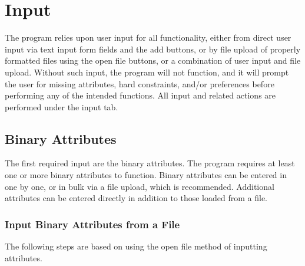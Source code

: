 \documentclass[12pt]{report}
\begin{document}
\chapter{Input}
The program relies upon user input for all functionality, either from direct user input via text input form fields and the add buttons, or by file upload of properly formatted files using the open file buttons, or a combination of user input and file upload. Without such input, the program will not function, and it will prompt the user for missing attributes, hard constraints, and/or preferences before performing any of the intended functions. All input and related actions are performed under the input tab.

\section{Binary Attributes}
The first required input are the binary attributes. The program requires at least one or more binary attributes to function. Binary attributes can be entered in one by one, or in bulk via a file upload, which is recommended. Additional attributes can be entered directly in addition to those loaded from a file.

\newpage
\subsection{Input Binary Attributes from a File}
The following steps are based on using the open file method of inputting attributes.\\
\end{document}
